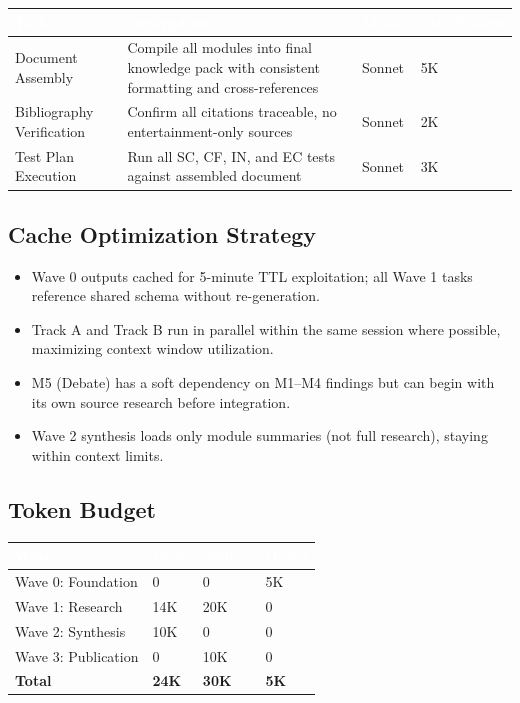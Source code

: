 \documentclass[11pt,letterpaper]{article}
\newcommand{\tableheader}[1]{\textbf{\sffamily\textcolor{white}{#1}}}
\begin{document}
\begin{center}
\begin{tabularx}{\textwidth}{L{3cm}XC{1.5cm}C{1.5cm}}
\toprule
{}
\tableheader{Task} & \tableheader{Description} & \tableheader{Model} & \tableheader{Est.\ Tokens} \\
\midrule
Document Assembly & Compile all modules into final knowledge pack with consistent formatting and cross-references & Sonnet & 5K \\
Bibliography Verification & Confirm all citations traceable, no entertainment-only sources & Sonnet & 2K \\
Test Plan Execution & Run all SC, CF, IN, and EC tests against assembled document & Sonnet & 3K \\
\bottomrule
\end{tabularx}
\end{center}

\subsection{Cache Optimization Strategy}

\begin{itemize}[leftmargin=2em]
\item Wave 0 outputs cached for 5-minute TTL exploitation; all Wave 1 tasks reference shared schema without re-generation.
\item Track A and Track B run in parallel within the same session where possible, maximizing context window utilization.
\item M5 (Debate) has a soft dependency on M1--M4 findings but can begin with its own source research before integration.
\item Wave 2 synthesis loads only module summaries (not full research), staying within context limits.
\end{itemize}

\subsection{Token Budget}

\begin{center}
\begin{tabularx}{\textwidth}{L{4cm}C{2cm}C{2cm}C{2cm}}
\toprule
{}
\tableheader{Wave} & \tableheader{Opus} & \tableheader{Sonnet} & \tableheader{Haiku} \\
\midrule
Wave 0: Foundation & 0 & 0 & 5K \\
Wave 1: Research & 14K & 20K & 0 \\
Wave 2: Synthesis & 10K & 0 & 0 \\
Wave 3: Publication & 0 & 10K & 0 \\
\midrule
\textbf{Total} & \textbf{24K} & \textbf{30K} & \textbf{5K} \\
\bottomrule
\end{tabularx}
\end{center}
\end{document}
